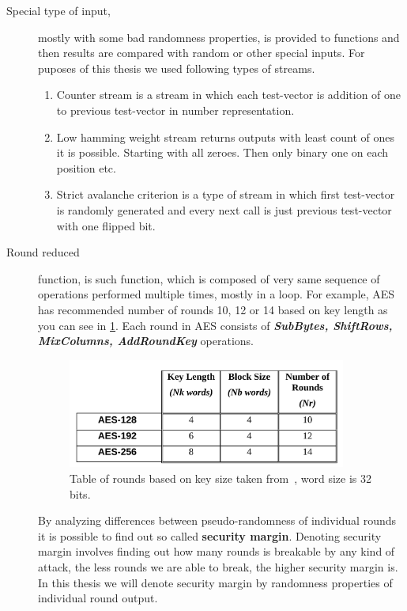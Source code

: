 \documentclass[
    digital,    %
    oneside,    %
    color,
    11pt,
    nocover,
    notable,
    nolof,
    nolot,
    final
]{fithesis3}
\begin{document}
\begin{description}
	\item[Special type of input,] mostly with some bad randomness properties, is provided to functions and then results are compared with random or other special inputs. For puposes of this thesis we used following types of streams.
	\begin{enumerate}
		\item Counter stream is a stream in which each test-vector is addition of one to previous test-vector in number representation.
		\item Low hamming weight stream returns outputs with least count of ones it is possible. Starting with all zeroes. Then only binary one on each position etc.
		\item Strict avalanche criterion is a type of stream in which first test-vector is randomly generated and every next call is just previous test-vector with one flipped bit.
	\end{enumerate}


	\item[Round reduced] function, is such function, which is composed of very same sequence of operations performed multiple times, mostly in a loop. For example, AES~\cite{FIPS-197} has recommended number of rounds 10, 12 or 14 based on key length as you can see in \cref{fig:fips197-rounds}. Each round in AES consists of \textbf{\textit{SubBytes, ShiftRows, MixColumns, AddRoundKey}} operations.
	
	\begin{figure}[h]
		\centering
		\includegraphics[width=0.9\textwidth]{./images/pictures/FIPS197-Nr-table.png}
		\caption{Table of rounds based on key size taken from~\cite{FIPS-197}, word size is 32 bits.}
		\label{fig:fips197-rounds}
	\end{figure}

	By analyzing differences between pseudo-randomness of individual rounds it is possible to find out so called \textbf{security margin}. Denoting security margin involves finding out how many rounds is breakable by any kind of attack, the less rounds we are able to break, the higher security margin is. In this thesis we will denote security margin by randomness properties of individual round output.
	

\end{description}
\end{document}
